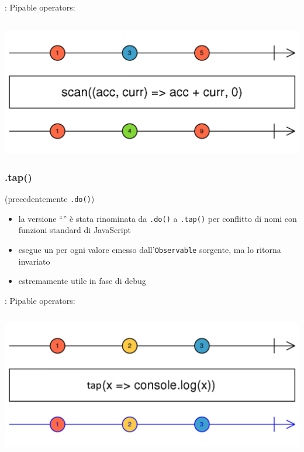             \begin{frame}[fragile]{\insertsubsectionhead}{: Pipable operators: \texttt{\insertsubsubsectionhead}}
                \inputminted{js}{src/scan.js}
                \includegraphics[width=\linewidth]{scan}
            \end{frame}

            \subsubsection{.tap()}\label{subsub:tap}

            \begin{frame}{\insertsubsectionhead}{}
                \begin{block}{\texttt{\insertsubsubsectionhead} (precedentemente \texttt{.do()})}
                    \begin{itemize}
                        \item
                            la versione ``'' è stata rinominata da \texttt{.do()} a \texttt{.tap()} per conflitto di nomi con funzioni standard di JavaScript
                        \item
                            esegue un  per ogni valore emesso dall'\texttt{Observable} sorgente, ma lo ritorna invariato
                        \item
                            estremamente utile in fase di debug
                    \end{itemize}
                \end{block}
            \end{frame}

            \begin{frame}[fragile]{\insertsubsectionhead}{: Pipable operators: \texttt{\insertsubsubsectionhead}}
                \inputminted{js}{src/tap.js}
                \includegraphics[width=\linewidth]{tap}
            \end{frame}

